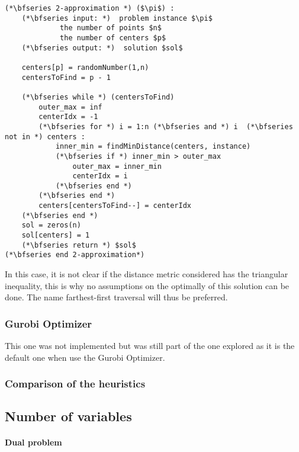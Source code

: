 \documentclass[a4paper,10pt]{article}
\begin{document}
\begin{lstlisting}[mathescape=true]
(*\bfseries 2-approximation *) ($\pi$) :
    (*\bfseries input: *)  problem instance $\pi$
             the number of points $n$
             the number of centers $p$
    (*\bfseries output: *)  solution $sol$
    
    centers[p] = randomNumber(1,n)
    centersToFind = p - 1
    
    (*\bfseries while *) (centersToFind)
        outer_max = inf
        centerIdx = -1
        (*\bfseries for *) i = 1:n (*\bfseries and *) i  (*\bfseries not in *) centers :
            inner_min = findMinDistance(centers, instance)
            (*\bfseries if *) inner_min > outer_max
                outer_max = inner_min
                centerIdx = i
            (*\bfseries end *)
        (*\bfseries end *)
        centers[centersToFind--] = centerIdx
    (*\bfseries end *)
    sol = zeros(n)
    sol[centers] = 1
    (*\bfseries return *) $sol$
(*\bfseries end 2-approximation*)
\end{lstlisting}

In this case, it is not clear if the distance metric considered has the triangular inequality, this is why no assumptions on the optimally of this solution can be done. The name farthest-first traversal will thus be preferred. 


\subsubsection{Gurobi Optimizer}

This one was not implemented but was still part of the one explored as it is the default one when use the Gurobi Optimizer.

\subsubsection{Comparison of the heuristics}


\subsection{Number of variables}

\paragraph{Dual problem}
\end{document}

